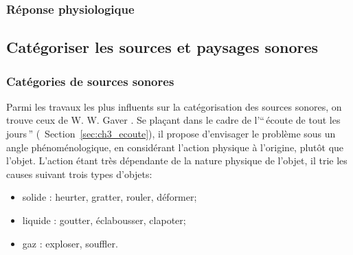 \subsubsection{Réponse physiologique}


\subsection{Catégoriser les sources et paysages sonores}
\label{sec:ch3_catSourceSoundScape}

\subsubsection{Catégories de sources sonores}
\label{sec:ch3_catSource}

Parmi les travaux les plus influents sur la catégorisation des sources sonores, on trouve ceux de W. W. Gaver \citep{gaver1993world,gaver1993we}. Se plaçant dans le cadre de l'``\,écoute de tout les jours\,'' (\cf~Section~\ref{sec:ch3_ecoute}), il propose d'envisager le problème sous un angle phénoménologique, en considérant l'action physique à l'origine, plutôt que l'objet. L'action étant très dépendante de la nature physique de l'objet, il trie les causes suivant trois types d'objets:

\begin{itemize}
\item solide : heurter, gratter, rouler, déformer;
\item liquide : goutter, éclabousser, clapoter;
\item gaz : exploser, souffler.
\end{itemize} 

